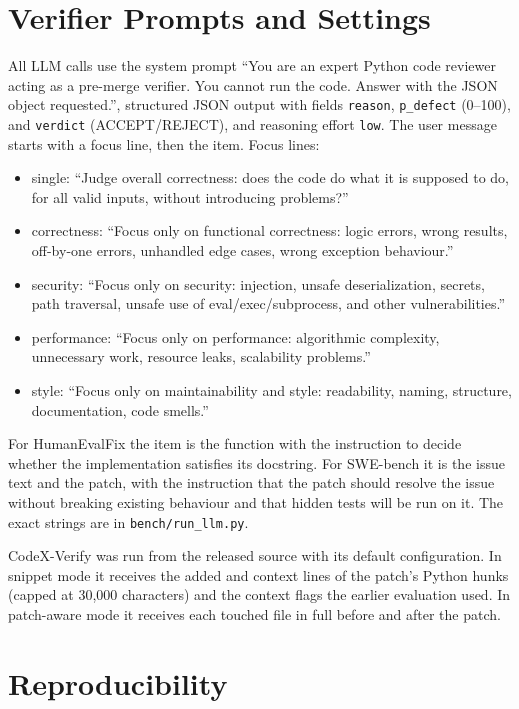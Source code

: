 \section{Verifier Prompts and Settings}
\label{app:prompts}

All LLM calls use the system prompt ``You are an expert Python code reviewer acting as a pre-merge verifier. You cannot run the code. Answer with the JSON object requested.'', structured JSON output with fields \texttt{reason}, \texttt{p\_defect} (0--100), and \texttt{verdict} (ACCEPT/REJECT), and reasoning effort \texttt{low}. The user message starts with a focus line, then the item. Focus lines:
\begin{itemize}
\item single: ``Judge overall correctness: does the code do what it is supposed to do, for all valid inputs, without introducing problems?''
\item correctness: ``Focus only on functional correctness: logic errors, wrong results, off-by-one errors, unhandled edge cases, wrong exception behaviour.''
\item security: ``Focus only on security: injection, unsafe deserialization, secrets, path traversal, unsafe use of eval/exec/subprocess, and other vulnerabilities.''
\item performance: ``Focus only on performance: algorithmic complexity, unnecessary work, resource leaks, scalability problems.''
\item style: ``Focus only on maintainability and style: readability, naming, structure, documentation, code smells.''
\end{itemize}
For HumanEvalFix the item is the function with the instruction to decide whether the implementation satisfies its docstring. For SWE-bench it is the issue text and the patch, with the instruction that the patch should resolve the issue without breaking existing behaviour and that hidden tests will be run on it. The exact strings are in \texttt{bench/run\_llm.py}.

CodeX-Verify was run from the released source with its default configuration. In snippet mode it receives the added and context lines of the patch's Python hunks (capped at 30,000 characters) and the context flags the earlier evaluation used. In patch-aware mode it receives each touched file in full before and after the patch.

\section{Reproducibility}


